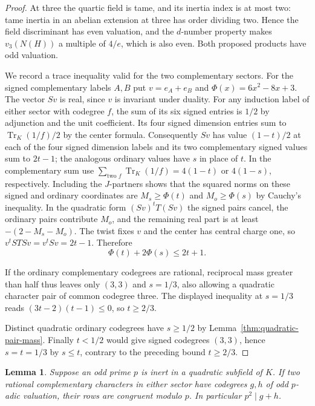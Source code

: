 \documentclass[11pt,reqno]{amsart}
\newtheorem{lemma}[theorem]{Lemma}
\theoremstyle{remark}\newtheorem{remark}[theorem]{Remark}
\numberwithin{equation}{section}
\begin{document}
\begin{proof}
At three the quartic field is tame, and
its inertia index is at most two: tame inertia in an abelian
extension at three has order dividing two. Hence the field
discriminant has even valuation, and the $d$-number property
makes $v_3(N(H))$ a multiple of $4/e$, which is also even.
Both proposed products have odd valuation.

We record a trace inequality valid for the two complementary
sectors. For the signed complementary labels $A,B$ put $v=e_A+e_B$ and $\Phi(x)=6x^2-8x+3$.
The vector $Sv$ is real, since $v$ is invariant under duality.
For any induction label of either sector with codegree $f$,
the sum of its six signed entries is $1/2$ by adjunction and
the unit coefficient. Its four signed dimension entries sum to
$\operatorname{Tr}_K(1/f)/2$ by the center formula. Consequently
$Sv$ has value $(1-t)/2$ at each of the four signed dimension
labels and its two complementary signed values sum to $2t-1$;
the analogous ordinary values have $s$ in place of $t$.
In the complementary sum use $\sum_{\text{two }f}
\operatorname{Tr}_K(1/f)=4(1-t)$ or $4(1-s)$, respectively.
Including the $J$-partners shows that the squared norms on these
signed and ordinary coordinates are $M_s\ge\Phi(t)$ and
$M_o\ge\Phi(s)$ by Cauchy's inequality. In the quadratic form
$(Sv)^tT(Sv)$ the signed pairs cancel, the ordinary pairs
contribute $M_o$, and the remaining real part is at least
$-(2-M_s-M_o)$. The twist fixes $v$ and the center has central
charge one, so $v^tSTS v=v^tSv=2t-1$. Therefore
\[
                  \Phi(t)+2\Phi(s)\le2t+1.
\]

If the ordinary complementary codegrees are rational, reciprocal
mass greater than half thus leaves only $(3,3)$ and $s=1/3$,
also allowing a quadratic character pair of common codegree three.
The displayed inequality at $s=1/3$ reads
$(3t-2)(t-1)\le0$, so $t\ge2/3$.

Distinct quadratic ordinary codegrees have $s\ge1/2$ by
Lemma~\ref{thm:quadratic-pair-mass}. Finally $t<1/2$ would give
signed codegrees $(3,3)$, hence $s=t=1/3$ by $s\le t$, contrary
to the preceding bound $t\ge2/3$.
\end{proof}
\begin{lemma}\label{lem:quartic-inert-congruence}
Suppose an odd prime $p$ is inert in a quadratic subfield of $K$.
If two rational complementary characters in either sector have
codegrees $g,h$ of odd $p$-adic valuation, their rows are congruent
modulo $p$. In particular $p^2\mid g+h$.
\end{lemma}
\end{document}
